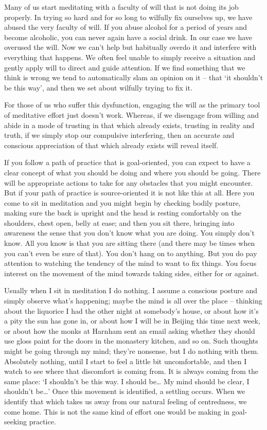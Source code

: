 Many of us start meditating with a faculty of will that is not doing its
job properly. In trying so hard and for so long to wilfully fix
ourselves up, we have abused the very faculty of will. If you abuse
alcohol for a period of years and become alcoholic, you can never again
have a social drink. In our case we have overused the will. Now we can't
help but habitually overdo it and interfere with everything that
happens. We often feel unable to simply receive a situation and gently
apply will to direct and guide attention. If we find something that we
think is wrong we tend to automatically slam an opinion on it -- that
`it shouldn't be this way', and then we set about wilfully trying to fix
it.

For those of us who suffer this dysfunction, engaging the will as the
primary tool of meditative effort just doesn't work. Whereas, if we
disengage from willing and abide in a mode of trusting in that which
already exists, trusting in reality and truth, if we simply stop our
compulsive interfering, then an accurate and conscious appreciation of
that which already exists will reveal itself.

If you follow a path of practice that is goal-oriented, you can expect
to have a clear concept of what you should be doing and where you should
be going. There will be appropriate actions to take for any obstacles
that you might encounter. But if your path of practice is
source-oriented it is not like this at all. Here you come to sit in
meditation and you might begin by checking bodily posture, making sure
the back is upright and the head is resting comfortably on the
shoulders, chest open, belly at ease; and then you sit there, bringing
into awareness the sense that you don't know what you are doing. You
simply don't know. All you know is that you are sitting there (and there
may be times when you can't even be sure of that). You don't hang on to
anything. But you do pay attention to watching the tendency of the mind
to want to fix things. You focus interest on the movement of the mind
towards taking sides, either for or against.

Usually when I sit in meditation I do nothing. I assume a conscious
posture and simply observe what's happening; maybe the mind is all over
the place -- thinking about the liquorice I had the other night at
somebody's house, or about how it's a pity the sun has gone in, or about
how I will be in Beijing this time next week, or about how the monks at
Harnham sent an email asking whether they should use gloss paint for the
doors in the monastery kitchen, and so on. Such thoughts might be going
through my mind; they're nonsense, but I do nothing with them.
Absolutely nothing, until I start to feel a little bit uncomfortable,
and then I watch to see where that discomfort is coming from. It is
always coming from the same place: `I shouldn't be this way. I should
be\ldots{} My mind should be clear, I shouldn't be\ldots{}' Once this movement is
identified, a settling occurs. When we identify that which takes us away
from our natural feeling of centredness, we come home. This is not the
same kind of effort one would be making in goal-seeking practice.

